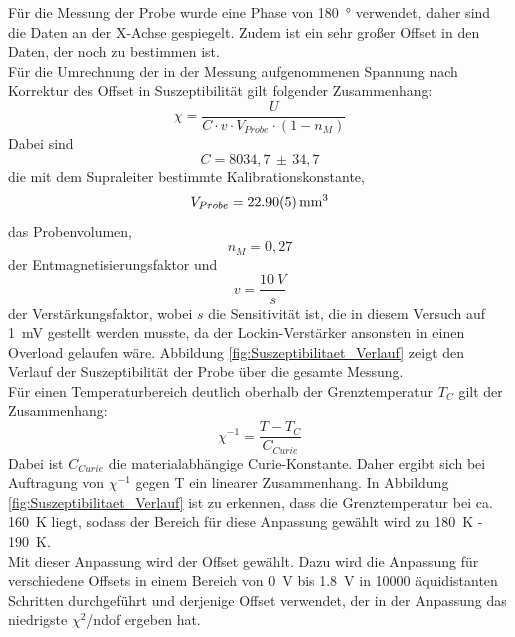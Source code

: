 \documentclass[12pt,a4paper]{article}
\begin{document}
Für die Messung der Probe wurde eine Phase von \SI{180}{\degree} verwendet, daher sind die Daten an der X-Achse gespiegelt. Zudem ist ein sehr großer Offset in den Daten, der noch zu bestimmen ist. \\
Für die Umrechnung der in der Messung aufgenommenen Spannung nach Korrektur des Offset in Suszeptibilität gilt folgender Zusammenhang:
\begin{equation*}
\chi = \dfrac{U}{C \cdot v \cdot V_{Probe} \cdot (1-n_M)}
\end{equation*}
Dabei sind
\begin{equation*}
C = 8034,7 \, \pm \, 34,7
\end{equation*}
die mit dem Supraleiter bestimmte Kalibrationskonstante, 
\begin{equation*}
V_{Probe} = \SI{22,90 \pm 0,05}{mm^3}
\end{equation*}
das Probenvolumen,
\begin{equation*}
n_M = 0,27
\end{equation*}
der Entmagnetisierungsfaktor und 
\begin{equation*}
v = \dfrac{\SI{10}{V}}{s}
\end{equation*}
der Verstärkungsfaktor, wobei $s$ die Sensitivität ist, die in diesem Versuch auf \SI{1}{mV} gestellt werden musste, da der Lockin-Verstärker ansonsten in einen Overload gelaufen wäre. Abbildung \ref{fig:Suszeptibilitaet_Verlauf} zeigt den Verlauf der Suszeptibilität der Probe über die gesamte Messung. \\
Für einen Temperaturbereich deutlich oberhalb der Grenztemperatur $T_C$ gilt der Zusammenhang:
\begin{equation*}
\chi ^{-1} = \dfrac{T - T_C}{C_{Curie}}
\end{equation*}
Dabei ist $C_{Curie}$ die materialabhängige Curie-Konstante. Daher ergibt sich bei Auftragung von $\chi ^{-1}$ gegen T ein linearer Zusammenhang. In Abbildung \ref{fig:Suszeptibilitaet_Verlauf} ist zu erkennen, dass die Grenztemperatur bei ca. \SI{160}{K} liegt, sodass der Bereich für diese Anpassung gewählt wird zu \SI{180}{K} - \SI{190}{K}. \\
Mit dieser Anpassung wird der Offset gewählt. Dazu wird die Anpassung für verschiedene Offsets in einem Bereich von \SI{0}{V} bis \SI{1,8}{V} in 10000 äquidistanten Schritten durchgeführt und derjenige Offset verwendet, der in der Anpassung das niedrigste $\chi ^2$/ndof ergeben hat.
\end{document}
